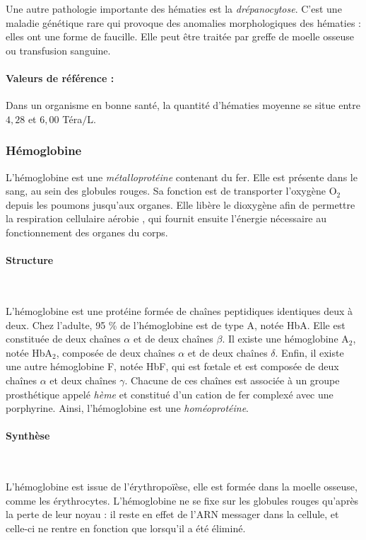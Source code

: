 \documentclass[12pt]{article}
\begin{document}
	Une autre pathologie importante des hématies est la \textit{drépanocytose}. C'est une maladie génétique rare qui provoque des anomalies morphologiques des hématies : elles ont une forme de faucille. Elle peut être traitée par greffe de moelle osseuse ou transfusion sanguine.
	
		\paragraph{Valeurs de référence :} Dans un organisme en bonne santé, la quantité d'hématies moyenne se situe entre $4,28$ et $6,00$ Téra$/$L.
		
	\subsubsection{Hémoglobine}
	L'hémoglobine est une \textit{métalloprotéine} contenant du fer. Elle est présente dans le sang, au sein des globules rouges. Sa fonction est de transporter l'oxygène $\mathrm O_2$ depuis les poumons jusqu'aux organes. Elle libère le dioxygène afin de permettre la respiration cellulaire aérobie , qui fournit ensuite l'énergie nécessaire au fonctionnement des organes du corps.
	
		\paragraph{Structure}\mbox{~}
		
	L'hémoglobine est une protéine formée de chaînes peptidiques identiques deux à deux. Chez l'adulte, 95 \% de l'hémoglobine est de type A, notée HbA. Elle est constituée de deux chaînes $\alpha$ et de deux chaînes $\beta$. Il existe une hémoglobine A$_2$, notée HbA$_2$, composée de deux chaînes $\alpha$ et de deux chaînes $\delta$. Enfin, il existe une autre hémoglobine F, notée HbF, qui est fœtale et est composée de deux chaînes $\alpha$ et deux chaînes $\gamma$. Chacune de ces chaînes est associée à un groupe prosthétique appelé \textit{hème} et constitué d'un cation de fer complexé avec une porphyrine. Ainsi, l'hémoglobine est une \textit{homéoprotéine}.
	
		\paragraph{Synthèse}\mbox{~}
		
	L'hémoglobine est issue de l'érythropoïèse, elle est formée dans la moelle osseuse, comme les érythrocytes. L'hémoglobine ne se fixe sur les globules rouges qu'après la perte de leur noyau : il reste en effet de l'ARN messager dans la cellule, et celle-ci ne rentre en fonction que lorsqu'il a été éliminé.
	
\end{document}
